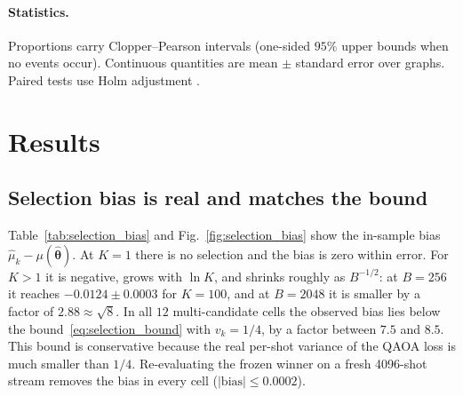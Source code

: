 \documentclass[a4paper,onecolumn,unpublished]{quantumarticle}
\newcommand{\thhat}{\widehat{\bm{\theta}}}
\begin{document}
\paragraph*{Statistics.}
Proportions carry Clopper--Pearson intervals \cite{clopper1934} (one-sided $95\%$ upper bounds when no events occur). Continuous quantities are mean $\pm$ standard error over graphs. Paired tests use Holm adjustment \cite{holm1979}.

\section{Results}
\label{sec:results}

\subsection{Selection bias is real and matches the bound}
\label{sec:res_bias}

Table~\ref{tab:selection_bias} and Fig.~\ref{fig:selection_bias} show the in-sample bias $\widehat\mu_{\hat k} - \mu(\thhat)$. At $K = 1$ there is no selection and the bias is zero within error. For $K > 1$ it is negative, grows with $\ln K$, and shrinks roughly as $B^{-1/2}$: at $B = 256$ it reaches $-0.0124 \pm 0.0003$ for $K = 100$, and at $B = 2048$ it is smaller by a factor of $2.88 \approx \sqrt{8}$. In all $12$ multi-candidate cells the observed bias lies below the bound~\eqref{eq:selection_bound} with $v_k = 1/4$, by a factor between $7.5$ and $8.5$. This bound is conservative because the real per-shot variance of the QAOA loss is much smaller than $1/4$. Re-evaluating the frozen winner on a fresh 4096-shot stream removes the bias in every cell ($|\text{bias}| \le 0.0002$).
\end{document}
